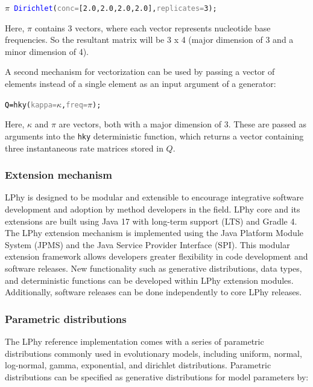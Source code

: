 \documentclass[10pt,letterpaper,table]{article}
\theoremstyle{definition}
\begin{document}
{\small
\begin{alltt}
      \textcolor{bluishgreen}{\(\pi\)} ~ \textcolor{blue}{Dirichlet}(\textcolor{gray}{conc=}[\textcolor{constant}{2.0}, \textcolor{constant}{2.0}, \textcolor{constant}{2.0}, \textcolor{constant}{2.0}], \textcolor{gray}{replicates=}\textcolor{constant}{3});
\end{alltt}
}
Here, $\pi$ contains 3 vectors, where each vector represents nucleotide base frequencies. 
So the resultant matrix will be 3 x 4 (major dimension of 3 and a minor dimension of 4). 

A second mechanism for vectorization can be used by passing a vector of elements instead of a single element as an input argument of a generator:

{\small
\begin{alltt}
    \textcolor{black}{Q = }\textcolor{generator}{hky}(\textcolor{gray}{kappa=}\textcolor{bluishgreen}{\(\kappa\)}, \textcolor{gray}{freq=}\textcolor{bluishgreen}{\(\pi\)});
\end{alltt} 
}

Here, $\kappa$ and $\pi$ are vectors, both with a major dimension of 3. 
These are passed as arguments into the \texttt{hky} deterministic function, which returns a vector containing three instantaneous rate matrices stored in $Q$.

\subsubsection{Extension mechanism}
LPhy is designed to be modular and extensible to encourage integrative software development and adoption by method developers in the field. 
LPhy core and its extensions are built using Java 17 with long-term support (LTS) and Gradle 4. 
The LPhy extension mechanism is implemented using the Java Platform Module System (JPMS) and the Java Service Provider Interface (SPI).
This modular extension framework allows developers greater flexibility in code development and software releases. 
New functionality such as generative distributions, data types, and deterministic functions can be developed within LPhy extension modules. 
Additionally, software releases can be done independently to core LPhy releases. 

\subsubsection{Parametric distributions}
The LPhy reference implementation comes with a series of parametric distributions commonly used in evolutionary models, including uniform, normal, log-normal, gamma, exponential, and dirichlet distributions. 
Parametric distributions can be specified as generative distributions for model parameters by:
\end{document}
